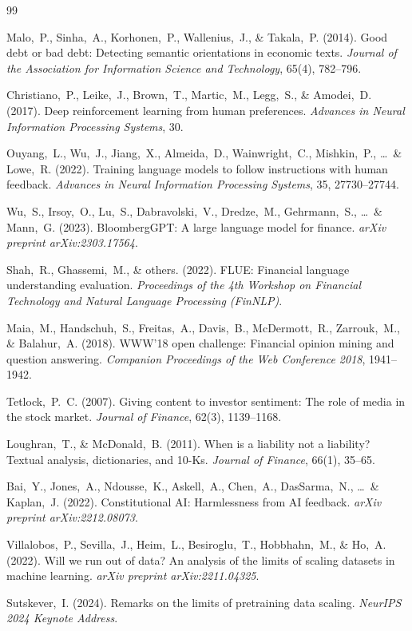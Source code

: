 \documentclass[11pt,a4paper]{article}
\begin{document}
\newpage

\begin{thebibliography}{99}

Malo,~P., Sinha,~A., Korhonen,~P., Wallenius,~J., \& Takala,~P. (2014).
Good debt or bad debt: Detecting semantic orientations in economic texts.
\textit{Journal of the Association for Information Science and Technology},
65(4), 782--796.

Christiano,~P., Leike,~J., Brown,~T., Martic,~M., Legg,~S., \& Amodei,~D. (2017).
Deep reinforcement learning from human preferences.
\textit{Advances in Neural Information Processing Systems}, 30.

Ouyang,~L., Wu,~J., Jiang,~X., Almeida,~D., Wainwright,~C., Mishkin,~P.,
\ldots\ \& Lowe,~R. (2022).
Training language models to follow instructions with human feedback.
\textit{Advances in Neural Information Processing Systems}, 35, 27730--27744.

Wu,~S., Irsoy,~O., Lu,~S., Dabravolski,~V., Dredze,~M., Gehrmann,~S.,
\ldots\ \& Mann,~G. (2023).
BloombergGPT: A large language model for finance.
\textit{arXiv preprint arXiv:2303.17564}.

Shah,~R., Ghassemi,~M., \& others. (2022).
FLUE: Financial language understanding evaluation.
\textit{Proceedings of the 4th Workshop on Financial Technology and Natural
Language Processing (FinNLP)}.

Maia,~M., Handschuh,~S., Freitas,~A., Davis,~B., McDermott,~R., Zarrouk,~M.,
\& Balahur,~A. (2018).
WWW'18 open challenge: Financial opinion mining and question answering.
\textit{Companion Proceedings of the Web Conference 2018}, 1941--1942.

Tetlock,~P.~C. (2007).
Giving content to investor sentiment: The role of media in the stock market.
\textit{Journal of Finance}, 62(3), 1139--1168.

Loughran,~T., \& McDonald,~B. (2011).
When is a liability not a liability? Textual analysis, dictionaries, and 10-Ks.
\textit{Journal of Finance}, 66(1), 35--65.

Bai,~Y., Jones,~A., Ndousse,~K., Askell,~A., Chen,~A., DasSarma,~N.,
\ldots\ \& Kaplan,~J. (2022).
Constitutional AI: Harmlessness from AI feedback.
\textit{arXiv preprint arXiv:2212.08073}.

Villalobos,~P., Sevilla,~J., Heim,~L., Besiroglu,~T., Hobbhahn,~M., \& Ho,~A. (2022).
Will we run out of data? An analysis of the limits of scaling datasets in machine
learning. \textit{arXiv preprint arXiv:2211.04325}.

Sutskever,~I. (2024).
Remarks on the limits of pretraining data scaling.
\textit{NeurIPS 2024 Keynote Address}.

\end{thebibliography}
\end{document}
